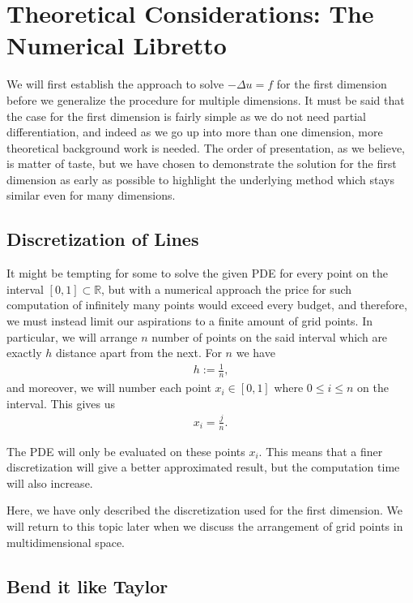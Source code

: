 \section{Theoretical Considerations: The Numerical Libretto}

We will first establish the approach to solve \(- \Delta u = f\) for the first dimension before we generalize the procedure for multiple dimensions. It must be said that the case for the first dimension is fairly simple as we do not need partial differentiation, and indeed as we go up into more than one dimension, more theoretical background work is needed. The order of presentation, as we believe, is matter of taste, but we have chosen to demonstrate the solution for the first dimension as early as possible to highlight the underlying method which stays similar even for many dimensions.

\subsection{Discretization of Lines}

It might be tempting for some to solve the given PDE for every point on the interval \([0, 1] \subset \mathbb{R}\), but with a numerical approach the price for such computation of infinitely many points would exceed every budget, and therefore, we must instead limit our aspirations to a finite amount of grid points. In particular, we will arrange \(n\) number of points on the said interval which are exactly \(h\) distance apart from the next. For \(n\) we have
\begin{align*}
	h := \frac{1}{n} \text{,}
\end{align*}
and moreover, we will number each point \(x_i \in [0, 1]\) where \(0 \leq i \leq n\)  on the interval. This gives us
\begin{align*}
	x_i = \frac{j}{n} \text{.}
\end{align*}

The PDE will only be evaluated on these points \(x_i\). This means that a finer discretization will give a better approximated result, but the computation time will also increase.

Here, we have only described the discretization used for the first dimension. We will return to this topic later when we discuss the arrangement of grid points in multidimensional space.

\subsection{Bend it like Taylor}


